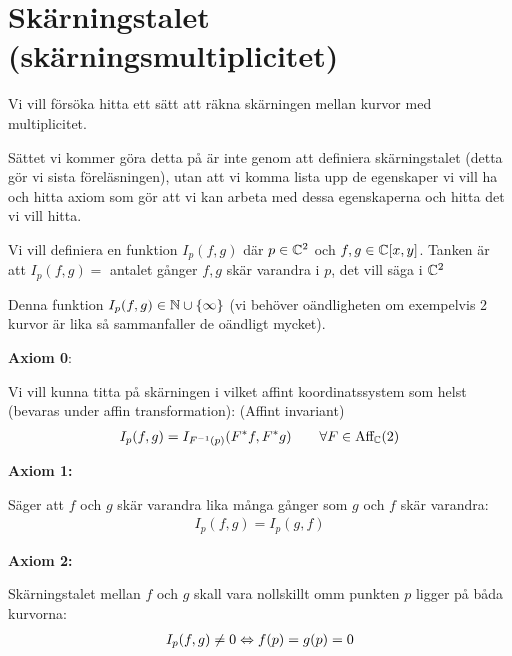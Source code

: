 \section{Skärningstalet (skärningsmultiplicitet)}\par
\noindent Vi vill försöka hitta ett sätt att räkna skärningen mellan kurvor med multiplicitet.\par
\noindent Sättet vi kommer göra detta på är inte genom att definiera skärningstalet (detta gör vi sista föreläsningen), utan att vi komma lista upp de egenskaper vi vill ha och hitta axiom som gör att vi kan arbeta med dessa egenskaperna och hitta det vi vill hitta.
\par\bigskip
\noindent Vi vill definiera en funktion $I_p(f,g)$ där $p\in\mathbb{C}^2$ och $f,g\in\mathbb{C}[x,y]$. Tanken är att $I_p(f,g) =$ antalet gånger $f,g$ skär varandra i $p$, det vill säga i $\mathbb{C}^2$
\par\bigskip
\noindent Denna funktion $I_p(f,g)\in\mathbb{N}\cup\left\{\infty\right\}$ (vi behöver oändligheten om exempelvis 2 kurvor är lika så sammanfaller de oändligt mycket).
\par\bigskip
\noindent\textbf{Axiom 0}:\par
\noindent Vi vill kunna titta på skärningen i vilket affint koordinatssystem som helst (bevaras under affin transformation): (Affint invariant)
\begin{equation*}
  \begin{gathered}
    I_p(f,g) = I_{F^{-1}(p)}(F^*f,F^*g)\qquad\forall F\in\text{Aff}_{\mathbb{C}}(2)
  \end{gathered}
\end{equation*}
\par\bigskip
\noindent\textbf{Axiom 1:}\par
\noindent Säger att $f$ och $g$ skär varandra lika många gånger som $g$ och $f$ skär varandra:
\begin{equation*}
  \begin{gathered}
    I_p(f,g) = I_p(g,f)
  \end{gathered}
\end{equation*}
\par\bigskip
\noindent\textbf{Axiom 2:}\par
\noindent Skärningstalet mellan $f$ och $g$ skall vara nollskillt omm punkten $p$ ligger på båda kurvorna:
\begin{equation*}
  \begin{gathered}
    I_p(f,g)\neq0\Leftrightarrow f(p) = g(p) = 0
  \end{gathered}
\end{equation*}
